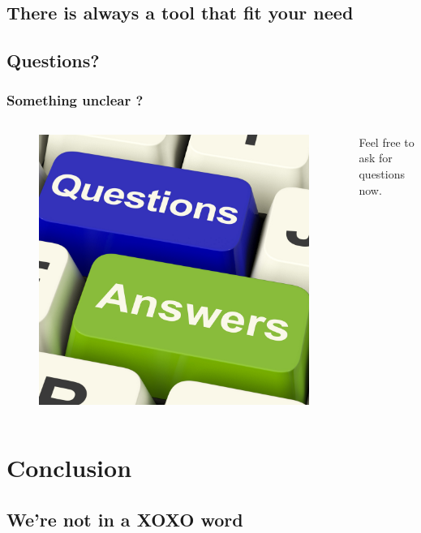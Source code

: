 \documentclass{beamer}
\begin{document}
\subsection{There is always a tool that fit your need}
\begin{frame}
\end{frame}

\subsection{Questions?}
\begin{frame}
\frametitle{Something unclear ?}
\begin{columns}[c]
\begin{figure}
\includegraphics[width=0.8\linewidth]{questions}
\end{figure}
Feel free to ask for questions now.
\end{columns}
\end{frame}

\section{Conclusion}
\subsection{We're not in a XOXO word}
\begin{frame}
\end{frame}
\end{document}
